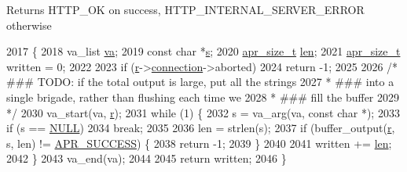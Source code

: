\begin{DoxyReturn}{Returns}
H\+T\+T\+P\+\_\+\+OK on success, H\+T\+T\+P\+\_\+\+I\+N\+T\+E\+R\+N\+A\+L\+\_\+\+S\+E\+R\+V\+E\+R\+\_\+\+E\+R\+R\+OR otherwise 
\end{DoxyReturn}

\begin{DoxyCode}
2017 \{
2018     va\_list \hyperlink{group__APR__Util__Bucket__Brigades_gafa1ac2f9aa9e56e3f87cbc5324a3114f}{va};
2019     \textcolor{keyword}{const} \textcolor{keywordtype}{char} *\hyperlink{group__APACHE__CORE__LISTEN_ga9359ed159c8b295541e3770172d34550}{s};
2020     \hyperlink{group__apr__platform_gaaa72b2253f6f3032cefea5712a27540e}{apr\_size\_t} \hyperlink{group__APACHE__CORE__LOG_gab5a43233d60ef05c5b5bf5cba3d74468}{len};
2021     \hyperlink{group__apr__platform_gaaa72b2253f6f3032cefea5712a27540e}{apr\_size\_t} written = 0;
2022 
2023     \textcolor{keywordflow}{if} (\hyperlink{group__APACHE__CORE__CONFIG_ga091cdd45984e865a888a4f8bb8fe107a}{r}->\hyperlink{structrequest__rec_a0924aae55826638314f76952ca5d60b1}{connection}->aborted)
2024         \textcolor{keywordflow}{return} -1;
2025 
2026     \textcolor{comment}{/* ### TODO: if the total output is large, put all the strings}
2027 \textcolor{comment}{     * ### into a single brigade, rather than flushing each time we}
2028 \textcolor{comment}{     * ### fill the buffer}
2029 \textcolor{comment}{     */}
2030     va\_start(va, \hyperlink{group__APACHE__CORE__CONFIG_ga091cdd45984e865a888a4f8bb8fe107a}{r});
2031     \textcolor{keywordflow}{while} (1) \{
2032         s = va\_arg(va, \textcolor{keyword}{const} \textcolor{keywordtype}{char} *);
2033         \textcolor{keywordflow}{if} (s == \hyperlink{pcre_8txt_ad7f989d16aa8ca809a36bc392c07fba1}{NULL})
2034             \textcolor{keywordflow}{break};
2035 
2036         len = strlen(s);
2037         \textcolor{keywordflow}{if} (buffer\_output(\hyperlink{group__APACHE__CORE__CONFIG_ga091cdd45984e865a888a4f8bb8fe107a}{r}, s, len) != \hyperlink{group__apr__errno_ga9ee311b7bf1c691dc521d721339ee2a6}{APR\_SUCCESS}) \{
2038             \textcolor{keywordflow}{return} -1;
2039         \}
2040 
2041         written += \hyperlink{group__APACHE__CORE__LOG_gab5a43233d60ef05c5b5bf5cba3d74468}{len};
2042     \}
2043     va\_end(va);
2044 
2045     \textcolor{keywordflow}{return} written;
2046 \}
\end{DoxyCode}



